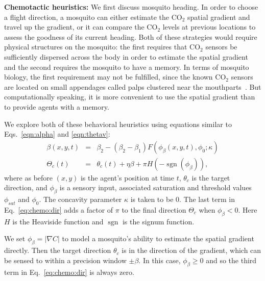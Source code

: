 \documentclass[12pt]{article}
\newif\ifcommentsw
\newcommand{\comment}[1]{\ifcommentsw  $\blacktriangleright$\ \textbf{#1}\ $\blacktriangleleft$ \fi}
\newcommand{\sgn}{\operatorname{sgn}}
\begin{document}
	\textbf{Chemotactic heuristics:} We first discuss mosquito heading. In order to choose a flight direction, a mosquito can either estimate the CO$_2$ spatial gradient and travel up the gradient, or it can compare the CO$_2$ levels at previous locations to assess the goodness of its current heading. Both of these strategies would require physical structures on the mosquito: the first requires that CO$_2$ sensors be sufficiently dispersed across the body in order to estimate the spatial gradient and the second requires the mosquito to have a memory. In terms of mosquito biology, the first requirement may not be fulfilled, since the known CO$_2$ sensors are located on small appendages called palps clustered near the mouthparts~\cite{Bowen1991}. But computationally speaking, it is more convenient to use the spatial gradient than to provide agents with a memory. 
	
	We explore both of these behavioral heuristics using equations similar to Eqs.~\eqref{eqn:alpha} and \eqref{eqn:thetav}: \comment{Bree: Rewrite using new rule. Be sure to add specific choices for function parameters $\kappa$, saturation level, and sensory threshold.}
	\begin{eqnarray}
		\beta(x,y,t) &=& \beta_2 - (\beta_2 - \beta_1)F(\phi_\beta(x,y,t), \phi_0; \kappa) \label{eq:chemo:precise}\\
		\Theta_c(t) &=&  \theta_c(t) + \eta\beta + \pi H(-\!\sgn(\phi_\beta)), \label{eq:chemo:dir}
	\end{eqnarray}
	where as before $(x,y)$ is the agent's position at time $t$, $\theta_c$ is the target direction, and $\phi_\beta$ is a sensory input, associated saturation and threshold values $\phi_{sat}$ and $\phi_0$. The concavity parameter $\kappa$ is taken to be 0. The last term in Eq.~\ref{eq:chemo:dir} adds a factor of $\pi$ to the final direction $\Theta_c$ when $\phi_\beta <0$. Here $H$ is the Heaviside function and $\sgn$ is the signum function.
	
	We set $\phi_\beta = \lvert \nabla C \rvert$ to model a mosquito's ability to estimate the spatial gradient directly. Then the target direction $\theta_c$ is in the direction of the gradient, which can be sensed to within a precision window $\pm \beta$. In this case, $\phi_\beta \geq 0$ and so the third term in Eq.~\ref{eq:chemo:dir} is always zero. 
	
\end{document}
